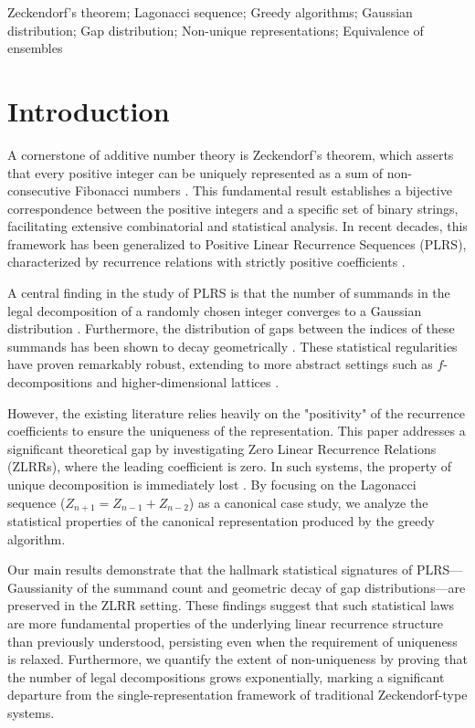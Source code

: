 \documentclass[11pt]{amsart}
\theoremstyle{plain}
\numberwithin{equation}{section} %
\numberwithin{table}{section} %
\numberwithin{figure}{section}
\begin{document}
				Zeckendorf's theorem; 
				Lagonacci sequence; 
				Greedy algorithms; 
				Gaussian distribution; 
				Gap distribution; 
				Non-unique representations;
				Equivalence of ensembles
	
	
	
	
	
	\section{Introduction}
	
	A cornerstone of additive number theory is Zeckendorf's theorem, which asserts that every positive integer can be uniquely represented as a sum of non-consecutive Fibonacci numbers \cite{zeckendorf1972}. This fundamental result establishes a bijective correspondence between the positive integers and a specific set of binary strings, facilitating extensive combinatorial and statistical analysis. In recent decades, this framework has been generalized to Positive Linear Recurrence Sequences (PLRS), characterized by recurrence relations with strictly positive coefficients \cite{kologlu2011summands}.
	
	A central finding in the study of PLRS is that the number of summands in the legal decomposition of a randomly chosen integer converges to a Gaussian distribution \cite{MillerWang2012JCTA}. Furthermore, the distribution of gaps between the indices of these summands has been shown to decay geometrically \cite{bower2015gaps}. These statistical regularities have proven remarkably robust, extending to more abstract settings such as $f$-decompositions \cite{DemontignyEtAl2014} and higher-dimensional lattices \cite{ChenEtAl2019Lattice}.
	
	However, the existing literature relies heavily on the "positivity" of the recurrence coefficients to ensure the uniqueness of the representation. This paper addresses a significant theoretical gap by investigating Zero Linear Recurrence Relations (ZLRRs), where the leading coefficient is zero. In such systems, the property of unique decomposition is immediately lost \cite{MartinezEtAl2022_I}. By focusing on the Lagonacci sequence ($Z_{n+1} = Z_{n-1} + Z_{n-2}$) as a canonical case study, we analyze the statistical properties of the canonical representation produced by the greedy algorithm.
	
	Our main results demonstrate that the hallmark statistical signatures of PLRS—Gaussianity of the summand count and geometric decay of gap distributions—are preserved in the ZLRR setting. These findings suggest that such statistical laws are more fundamental properties of the underlying linear recurrence structure than previously understood, persisting even when the requirement of uniqueness is relaxed. Furthermore, we quantify the extent of non-uniqueness by proving that the number of legal decompositions grows exponentially, marking a significant departure from the single-representation framework of traditional Zeckendorf-type systems.
	
\end{document}

